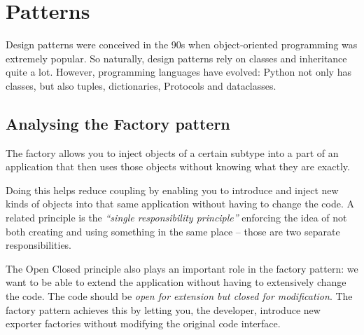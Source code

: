 \chapter{Patterns}

Design patterns were conceived in the 90s when object-oriented programming was extremely popular. So naturally, design patterns rely on classes and inheritance quite a lot. However, programming languages have evolved: Python not only has classes, but also tuples, dictionaries, Protocols and dataclasses.



\section{Analysing the Factory pattern}

The factory allows you to inject objects of a certain subtype into a part of an application that then uses those objects without knowing what they are exactly.

Doing this helps reduce coupling by enabling you to introduce and inject new kinds of objects into that same application without having to change the code. A related principle is the \emph{``single responsibility principle''} enforcing the idea of not both creating and using something in the same place -- those are two separate responsibilities.

The Open Closed principle also plays an important role in the factory pattern: we want to be able to extend the application without having to extensively change the code. The code should be \emph{open for extension but closed for modification}. The factory pattern achieves this by letting you, the developer, introduce new exporter factories without modifying the original code interface.

